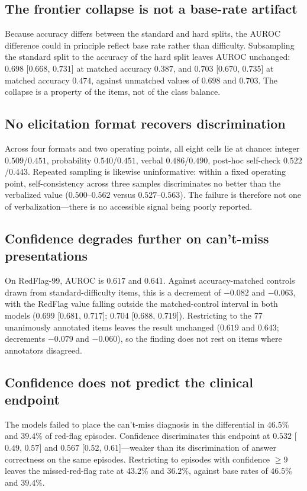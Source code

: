 \documentclass[journal,twoside]{IEEEtran}
\begin{document}
\subsection{The frontier collapse is not a base-rate artifact}
Because accuracy differs between the standard and hard splits, the AUROC difference could in
principle reflect base rate rather than difficulty. Subsampling the standard split to the accuracy of
the hard split leaves AUROC unchanged: $0.698$ [$0.668$, $0.731$] at matched accuracy $0.387$, and
$0.703$ [$0.670$, $0.735$] at matched accuracy $0.474$, against unmatched values of $0.698$ and
$0.703$. The collapse is a property of the items, not of the class balance.

\subsection{No elicitation format recovers discrimination}
Across four formats and two operating points, all eight cells lie at chance: integer
$0.509$/$0.451$, probability $0.540$/$0.451$, verbal $0.486$/$0.490$, post-hoc self-check
$0.522$/$0.443$. Repeated sampling is likewise uninformative: within a fixed operating point,
self-consistency across three samples discriminates no better than the verbalized value
($0.500$--$0.562$ versus $0.527$--$0.563$). The failure is therefore not one of verbalization---there
is no accessible signal being poorly reported.

\subsection{Confidence degrades further on can't-miss presentations}
On RedFlag-99, AUROC is $0.617$ and $0.641$. Against accuracy-matched controls drawn from
standard-difficulty items, this is a decrement of $-0.082$ and $-0.063$, with the RedFlag value
falling outside the matched-control interval in both models
($0.699$ [$0.681$, $0.717$]; $0.704$ [$0.688$, $0.719$]). Restricting to the 77 unanimously annotated
items leaves the result unchanged ($0.619$ and $0.643$; decrements $-0.079$ and $-0.060$), so the
finding does not rest on items where annotators disagreed.

\subsection{Confidence does not predict the clinical endpoint}
The models failed to place the can't-miss diagnosis in the differential in $46.5\%$ and $39.4\%$ of
red-flag episodes. Confidence discriminates this endpoint at $0.532$ [$0.49$, $0.57$] and
$0.567$ [$0.52$, $0.61$]---weaker than its discrimination of answer correctness on the same
episodes. Restricting to episodes with confidence $\geq 9$ leaves the missed-red-flag rate at
$43.2\%$ and $36.2\%$, against base rates of $46.5\%$ and $39.4\%$.
\end{document}
